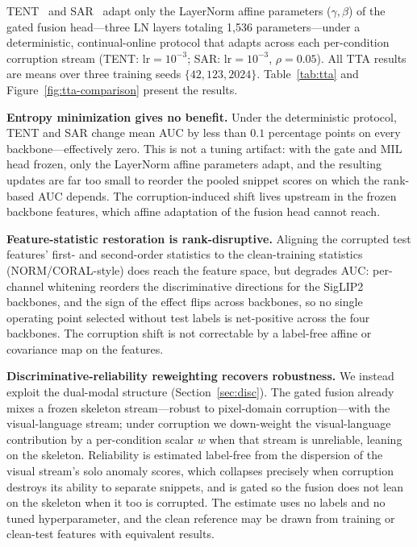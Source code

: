 \documentclass[sigconf]{acmart}
\begin{document}
TENT~\cite{wang2021tent} and SAR~\cite{niu2023sar} adapt only the LayerNorm affine parameters ($\gamma,\beta$) of the gated fusion head---three LN layers totaling 1{,}536 parameters---under a deterministic, continual-online protocol that adapts across each per-condition corruption stream (TENT: $\text{lr}=10^{-3}$; SAR: $\text{lr}=10^{-3}$, $\rho=0.05$). All TTA results are means over three training seeds $\{42,123,2024\}$. Table~\ref{tab:tta} and Figure~\ref{fig:tta-comparison} present the results.

\textbf{Entropy minimization gives no benefit.} Under the deterministic protocol, TENT and SAR change mean AUC by less than $0.1$ percentage points on every backbone---effectively zero. This is not a tuning artifact: with the gate and MIL head frozen, only the LayerNorm affine parameters adapt, and the resulting updates are far too small to reorder the pooled snippet scores on which the rank-based AUC depends. The corruption-induced shift lives upstream in the frozen backbone features, which affine adaptation of the fusion head cannot reach.

\textbf{Feature-statistic restoration is rank-disruptive.} Aligning the corrupted test features' first- and second-order statistics to the clean-training statistics (NORM/CORAL-style) does reach the feature space, but degrades AUC: per-channel whitening reorders the discriminative directions for the SigLIP2 backbones, and the sign of the effect flips across backbones, so no single operating point selected without test labels is net-positive across the four backbones. The corruption shift is not correctable by a label-free affine or covariance map on the features.

\textbf{Discriminative-reliability reweighting recovers robustness.} We instead exploit the dual-modal structure (Section~\ref{sec:disc}). The gated fusion already mixes a frozen skeleton stream---robust to pixel-domain corruption---with the visual-language stream; under corruption we down-weight the visual-language contribution by a per-condition scalar $w$ when that stream is unreliable, leaning on the skeleton. Reliability is estimated label-free from the dispersion of the visual stream's solo anomaly scores, which collapses precisely when corruption destroys its ability to separate snippets, and is gated so the fusion does not lean on the skeleton when it too is corrupted. The estimate uses no labels and no tuned hyperparameter, and the clean reference may be drawn from training or clean-test features with equivalent results.
\end{document}

